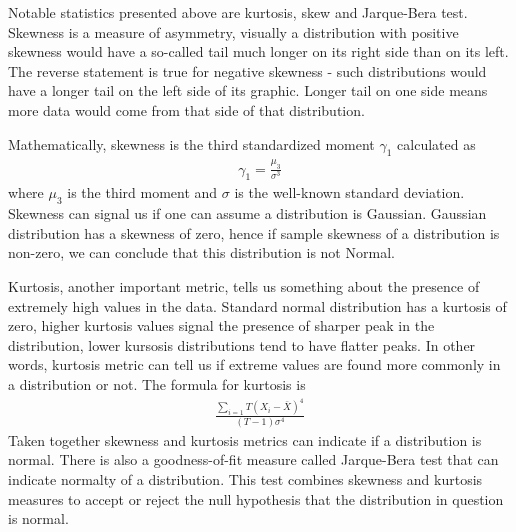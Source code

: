 Notable statistics presented above are kurtosis, skew and Jarque-Bera
test. Skewness is a measure of asymmetry, visually a distribution with positive
skewness would have a so-called tail much longer on its right side than on its
left. The reverse statement is true for negative skewness - such distributions
would have a longer tail on the left side of its graphic. Longer tail on one
side means more data would come from that side of that distribution.

\begin{figure}[!h]
\vspace{0.6cm}
\end{figure}

Mathematically, skewness is the third standardized moment $\gamma_1$ calculated
as 
\begin{eqnarray*}
\gamma_1 = \frac{\mu_3}{\sigma^3}
\end{eqnarray*}
where $\mu_3$ is the third moment and $\sigma$ is the well-known standard
deviation. Skewness can signal us if one can assume a distribution is
Gaussian. Gaussian distribution has a skewness of zero, hence if sample skewness
of a distribution is non-zero, we can conclude that this distribution is not
Normal. 

Kurtosis, another important metric, tells us something about the presence of
extremely high values in the data. Standard normal distribution has a kurtosis
of zero, higher kurtosis values signal the presence of sharper peak in the
distribution, lower kursosis distributions tend to have flatter peaks. In other
words, kurtosis metric can tell us if extreme values are found more commonly in
a distribution or not. The formula for kurtosis is 
\begin{eqnarray*}
\frac{\sum_{i=1}T(X_i - \bar{X})^4}{(T-1)\sigma^4}
\end{eqnarray*}
Taken together skewness and kurtosis metrics can indicate if a distribution is
normal. There is also a goodness-of-fit measure called Jarque-Bera test that can
indicate normalty of a distribution. This test combines skewness and kurtosis
measures to accept or reject the null hypothesis that the distribution in
question is normal.


